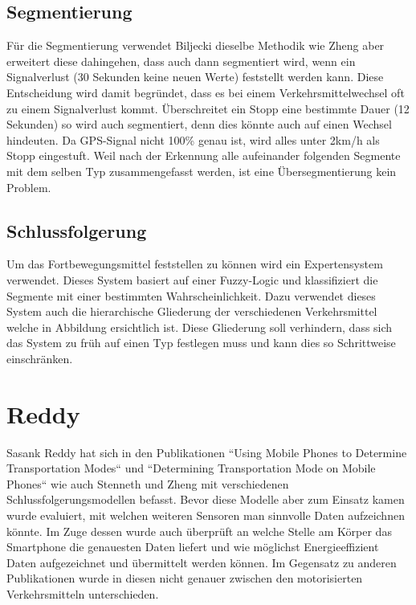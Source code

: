 \subsection{Segmentierung}
Für die Segmentierung verwendet Biljecki dieselbe Methodik wie Zheng aber erweitert diese dahingehen, dass auch dann segmentiert wird, wenn ein Signalverlust (30 Sekunden keine neuen Werte) feststellt werden kann. Diese Entscheidung wird damit begründet, dass es bei einem Verkehrsmittelwechsel oft zu einem Signalverlust kommt. 
Überschreitet ein Stopp eine bestimmte Dauer (12 Sekunden) so wird auch segmentiert, denn dies könnte auch auf einen Wechsel hindeuten. Da GPS-Signal nicht 100\% genau ist, wird alles unter 2km/h als Stopp eingestuft. Weil nach der Erkennung alle aufeinander folgenden Segmente mit dem selben Typ zusammengefasst werden, ist eine Übersegmentierung kein Problem.

\subsection{Schlussfolgerung}
Um das Fortbewegungsmittel feststellen zu können wird ein Expertensystem verwendet. Dieses System basiert auf einer Fuzzy-Logic und klassifiziert die Segmente mit einer bestimmten Wahrscheinlichkeit. Dazu verwendet dieses System auch die hierarchische Gliederung der verschiedenen Verkehrsmittel welche in Abbildung  ersichtlich ist. Diese Gliederung soll verhindern, dass sich das System zu früh auf einen Typ festlegen muss und kann dies so Schrittweise einschränken.  


\section{Reddy}
Sasank Reddy hat sich in den Publikationen ``Using Mobile Phones to Determine Transportation Modes`` und ``Determining Transportation Mode on Mobile Phones`` wie auch Stenneth und Zheng mit verschiedenen Schlussfolgerungsmodellen befasst. Bevor diese Modelle aber zum Einsatz kamen wurde evaluiert, mit welchen weiteren Sensoren man sinnvolle Daten aufzeichnen könnte. Im Zuge dessen wurde auch überprüft an welche Stelle am Körper das Smartphone die genauesten Daten liefert und wie möglichst Energieeffizient Daten aufgezeichnet und übermittelt werden können. Im Gegensatz zu anderen Publikationen wurde in diesen nicht genauer zwischen den motorisierten Verkehrsmitteln unterschieden.


